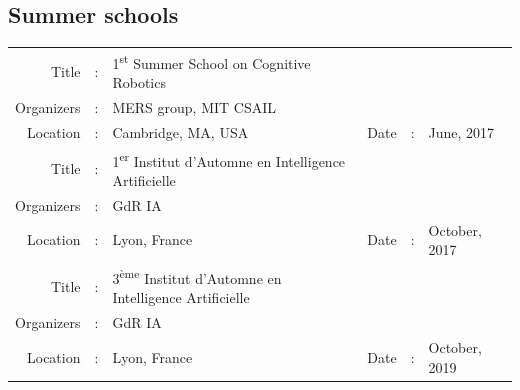 \documentclass[a4paper,11pt]{article}
\begin{document}
\subsection*{Summer schools}
\centering
\small
\begin{tabular}{r c l r c l}
	Title &: &1\textsuperscript{st} Summer School on Cognitive Robotics \\
	Organizers &: &MERS group, MIT CSAIL \\
	Location &: &Cambridge, MA, USA &Date &: &June, 2017 \\
	\hline
	Title &: &1\textsuperscript{er} Institut d'Automne en Intelligence Artificielle \\
	Organizers &: &GdR IA \\
	Location &: &Lyon, France       &Date &: &October, 2017 \\
	\hline
	Title &: &3\textsuperscript{{\`e}me} Institut d'Automne en Intelligence Artificielle \\
	Organizers &: &GdR IA \\
	Location &: &Lyon, France       &Date &: &October, 2019 \\
\end{tabular}
\flushleft
\end{document}
